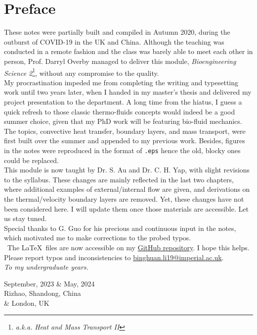 \documentclass[12pt, a4paper]{article}
\numberwithin{equation}{subsection}
\begin{document}
\section*{Preface}
\begin{spacing}{1.15}
These notes were partially built and compiled in Autumn 2020, during the outburst of COVID-19 in the UK and China. Although the teaching was conducted in a remote fashion and the class was barely able to meet each other in person, Prof. Darryl Overby managed to deliver this module, \textit{Bioengineering Science 2}\footnote{\textit{a.k.a.} \textit{Heat and Mass Transport II}}, without any compromise to the quality.\\

My procrastination impeded me from completing the writing and typesetting work until two years later, when I handed in my master's thesis and delivered my project presentation to the department. A long time from the hiatus, I guess a quick refresh to those classic thermo-fluids concepts would indeed be a good summer choice, given that my PhD work will be featuring bio-fluid mechanics.\\

The topics, convective heat transfer, boundary layers, and mass transport, were first built over the summer and appended to my previous work. Besides, figures in the notes were reproduced in the format of \texttt{.eps} hence the old, blocky ones could be replaced.\\ 

This module is now taught by Dr. S. Au and Dr. C. H. Yap, with slight revisions to the syllabus. These changes are mainly reflected in the last two chapters, where additional examples of external/internal flow are given, and derivations on the thermal/velocity boundary layers are removed. Yet, these changes have not been considered here. I will update them once those materials are accessible. Let us stay tuned.\\

Special thanks to G. Guo for his precious and continuous input in the notes, which motivated me to make corrections to the probed typos.\\

\faGithub \ The \LaTeX \ files are now accessible on my \href{https://github.com/binghuan-li/Notes-and-Formula-Sheets}{GitHub repository}. I hope this helps. Please report typos and inconsistencies to \href{mailto:binghuan.li19@imperial.ac.uk}{binghuan.li19@imperial.ac.uk}.\\

\textit{To my undergraduate years.}
\begin{flushright}
    September, 2023 \& May, 2024\\
    Rizhao, Shandong, China\\
    \& London, UK
\end{flushright}
\end{spacing}
\newpage
\tableofcontents
\newpage
\end{document}

